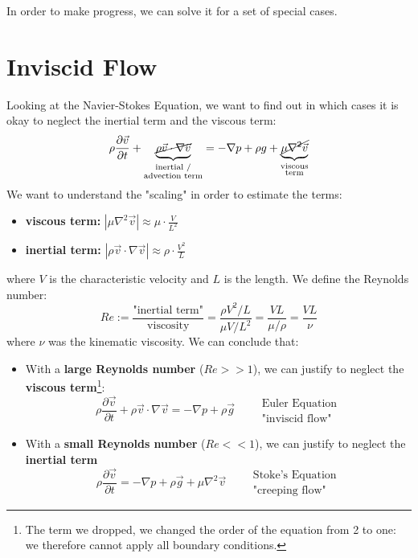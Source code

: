In order to make progress, we can solve it for a set of special cases.
  
\section{Inviscid Flow}
Looking at the Navier-Stokes Equation, we want to find out in which cases it is okay to neglect the inertial term and the viscous term:
\begin{equation*}
	\rho \frac{\partial \vec v}{\partial t} + \underbrace{\cancel{\rho \vec v \cdot \nabla \vec v}}_{\substack{\text{inertial /}\\\text{advection term}}}  = -\nabla p + \rho g + \underbrace{\cancel{\mu \nabla^2 \vec v}}_{\substack{\text{viscous}\\\text{term}}}
\end{equation*}
We want to understand the "scaling" in order to estimate the terms:
\begin{itemize}
	\setlength{\itemsep}{-5pt}
	\item \textbf{viscous term:} $|\mu\nabla^2 \vec v| \approx \mu \cdot \frac{V}{L^2}$
	\item \textbf{inertial term:} $|\rho \vec v \cdot \nabla \vec v|\approx \rho \cdot \frac{V^2}{L}$
\end{itemize}
where $V$ is the characteristic velocity and $L$ is the length.
We define the Reynolds number:
\begin{equation*}
	Re := \frac{\text{"inertial term"}}{\text{viscosity}} = \frac{\rho V^2/L}{\mu V/L^2} = \frac{VL}{\mu/\rho} = \frac{VL}{\nu}
\end{equation*}
where $\nu$ was the kinematic viscosity.
We can conclude that:
\begin{itemize}
	\setlength{\itemsep}{-5pt}
	\item With a \textbf{large Reynolds number} ($Re >> 1$), we can justify to neglect the \textbf{viscous term}\footnote{The term we dropped, we changed the order of the equation from 2 to one: we therefore cannot apply all boundary conditions.}:
	\begin{equation*}
		\boxed{\rho \frac{\partial \vec v}{\partial t} + \rho \vec v \cdot \nabla \vec v =-\nabla p + \rho \vec g }\qquad \substack{\text{Euler Equation}\\\text{"inviscid flow"}}
	\end{equation*}
	\item With a \textbf{small Reynolds number} ($Re << 1$), we can justify to neglect the \textbf{inertial term}
	\begin{equation*}
		\boxed{\rho \frac{\partial \vec v}{\partial t} =-\nabla p + \rho \vec g + \mu \nabla^2\vec v}\qquad \substack{\text{Stoke's Equation}\\\text{"creeping flow"}}
	\end{equation*}
\end{itemize}

